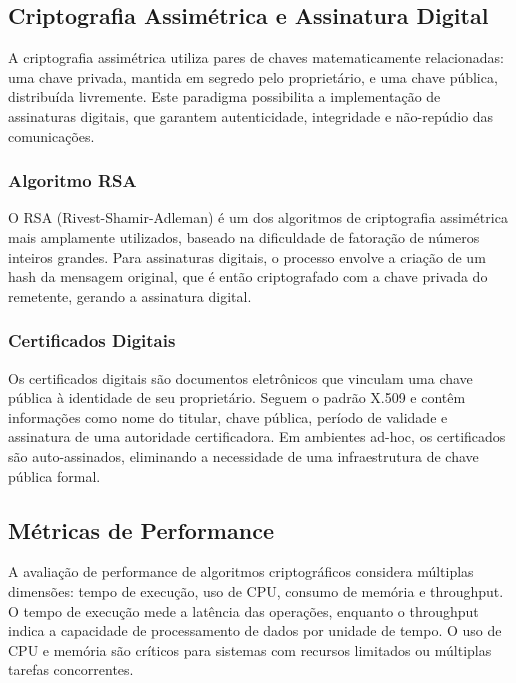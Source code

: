 \documentclass[12pt,a4paper,oneside]{article}
\begin{document}
\subsection{Criptografia Assimétrica e Assinatura Digital}

A criptografia assimétrica utiliza pares de chaves matematicamente relacionadas: uma chave privada, mantida em segredo pelo proprietário, e uma chave pública, distribuída livremente. Este paradigma possibilita a implementação de assinaturas digitais, que garantem autenticidade, integridade e não-repúdio das comunicações.

\subsubsection{Algoritmo RSA}

O RSA (Rivest-Shamir-Adleman) é um dos algoritmos de criptografia assimétrica mais amplamente utilizados, baseado na dificuldade de fatoração de números inteiros grandes. Para assinaturas digitais, o processo envolve a criação de um hash da mensagem original, que é então criptografado com a chave privada do remetente, gerando a assinatura digital.

\subsubsection{Certificados Digitais}

Os certificados digitais são documentos eletrônicos que vinculam uma chave pública à identidade de seu proprietário. Seguem o padrão X.509 e contêm informações como nome do titular, chave pública, período de validade e assinatura de uma autoridade certificadora. Em ambientes ad-hoc, os certificados são auto-assinados, eliminando a necessidade de uma infraestrutura de chave pública formal.

\subsection{Métricas de Performance}

A avaliação de performance de algoritmos criptográficos considera múltiplas dimensões: tempo de execução, uso de CPU, consumo de memória e throughput. O tempo de execução mede a latência das operações, enquanto o throughput indica a capacidade de processamento de dados por unidade de tempo. O uso de CPU e memória são críticos para sistemas com recursos limitados ou múltiplas tarefas concorrentes.

\end{document}
